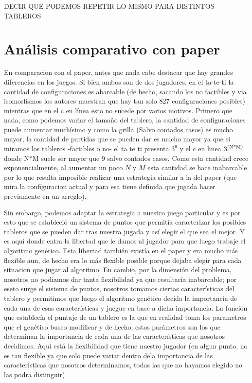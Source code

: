 \documentclass[A4paper,oneside,fleqn,11pt]{article}
\theoremstyle{definition}
\begin{document}
DECIR QUE PODEMOS REPETIR LO MISMO PARA DISTINTOS TABLEROS



\section{Análisis comparativo con paper}

En comparacion con el paper, antes que nada cabe destacar que hay grandes diferencias en los juegos. Si bien ambos son de dos jugadores, en el ta-te-ti la cantidad de configuraciones es abarcable (de hecho, sacando los no factibles y via isomorfismos los autores muestran que hay tan solo 827 configuraciones posibles) mientras que en el c en línea esto no sucede por varios motivos. Primero que nada, como podemos variar el tamaño del tablero, la cantidad de configuraciones puede aumentar muchísimo y como la grilla (Salvo contados casos) es mucho mayor, la cantidad de partidas que se pueden dar es mucho mayor ya que si miramos los tableros -factibles o no- el ta te ti presenta $3^9$ y el c en linea $3\textsuperscript{(N*M)}$ donde N*M suele ser mayor que 9 salvo contados casos. Como esta cantidad crece exponencialmente, al aumentar un poco $N$ y $M$ esta cantidad se hace inabarcable por lo que resulta imposible realizar una estrategia similar a la del paper (que mira la configuracion actual y para esa tiene definida que jugada hacer previamente en un arreglo).

Sin embargo, podemos adaptar la estrategia a nuestro juego particular y es por esto que se estableció un sistema de puntos que permitía caracterizar los posibles tableros que se pueden dar tras nuestra jugada y así elegir el que sea el mejor. Y es aquí donde entra la libertad que le damos al jugador para que luego trabaje el algoritmo genético. Esta libertad también existía en el paper y era mucho más flexible aun, de hecho era lo más flexible posible porque dejaba elegir para cada situacion que jugar al algoritmo. En cambio, por la dimensión del problema,  nosotros no podiamos dar tanta flexibilidad ya que resultaría inabarcable; por eseto surge el sistema de puntos, nosotros tomamos ciertas características del tablero y permitimos que luego el algoritmo genético decida la importancia de cada una de esas características y juegue en base a dicha importancia. La función que establecía el puntaje de un tablero es la que en realidad toma los parametros que el genético busco modificar y de hecho, estos parámetros son los que determinan la importancia de cada una de las características que nosotros decidimos. Aquí está la flexibilidad que tiene nuestro jugador (en algun punto, no es tan flexible ya que solo puede variar dentro dela importancia de las características que nosotros determinamos, todas las que no hayamos elegido no las podra distinguir).
\end{document}

